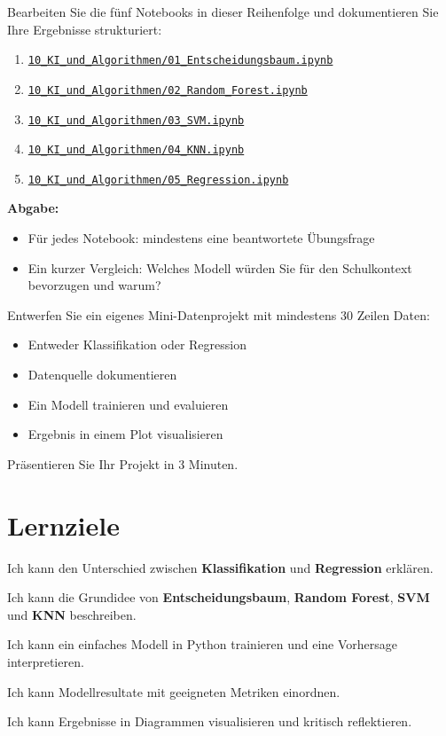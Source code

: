 \begin{myexercise}
Bearbeiten Sie die fünf Notebooks in dieser Reihenfolge und dokumentieren Sie
Ihre Ergebnisse strukturiert:
\begin{enumerate}
    \item \href{\notebookurl}{\texttt{10\_KI\_und\_Algorithmen/01\_Entscheidungsbaum.ipynb}}
    \item \href{\notebookurl}{\texttt{10\_KI\_und\_Algorithmen/02\_Random\_Forest.ipynb}}
    \item \href{\notebookurl}{\texttt{10\_KI\_und\_Algorithmen/03\_SVM.ipynb}}
    \item \href{\notebookurl}{\texttt{10\_KI\_und\_Algorithmen/04\_KNN.ipynb}}
    \item \href{\notebookurl}{\texttt{10\_KI\_und\_Algorithmen/05\_Regression.ipynb}}
\end{enumerate}

\textbf{Abgabe:}
\begin{itemize}
    \item Für jedes Notebook: mindestens eine beantwortete Übungsfrage
    \item Ein kurzer Vergleich: Welches Modell würden Sie für den Schulkontext bevorzugen und warum?
\end{itemize}
\end{myexercise}

\begin{mychallenge}[Transferaufgabe]
Entwerfen Sie ein eigenes Mini-Datenprojekt mit mindestens 30 Zeilen Daten:
\begin{itemize}
    \item Entweder Klassifikation oder Regression
    \item Datenquelle dokumentieren
    \item Ein Modell trainieren und evaluieren
    \item Ergebnis in einem Plot visualisieren
\end{itemize}
Präsentieren Sie Ihr Projekt in 3 Minuten.
\end{mychallenge}

\section{Lernziele}
\begin{todolist}
    \item Ich kann den Unterschied zwischen \textbf{Klassifikation} und \textbf{Regression} erklären.
    \item Ich kann die Grundidee von \textbf{Entscheidungsbaum}, \textbf{Random Forest}, \textbf{SVM} und \textbf{KNN} beschreiben.
    \item Ich kann ein einfaches Modell in Python trainieren und eine Vorhersage interpretieren.
    \item Ich kann Modellresultate mit geeigneten Metriken einordnen.
    \item Ich kann Ergebnisse in Diagrammen visualisieren und kritisch reflektieren.
\end{todolist}
